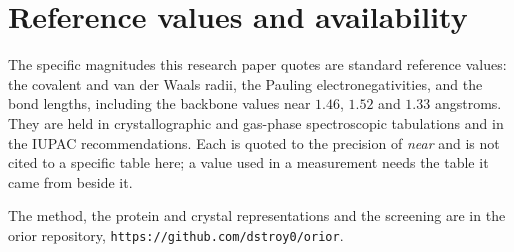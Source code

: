 \chapter{Reference values and availability}

The specific magnitudes this research paper quotes are standard reference values: the covalent and
van der Waals radii, the Pauling electronegativities, and the bond lengths, including the backbone
values near $1.46$, $1.52$ and $1.33$ angstroms. They are held in crystallographic and gas-phase
spectroscopic tabulations and in the IUPAC recommendations. Each is quoted to the precision of
\emph{near} and is not cited to a specific table here; a value used in a measurement needs the table
it came from beside it.

The method, the protein and crystal representations and the screening are in the orior repository,
\texttt{https://github.com/dstroy0/orior}.
